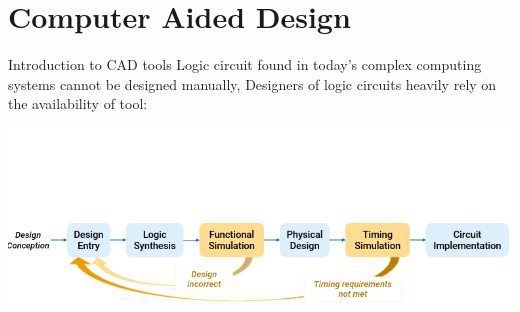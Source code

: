     \section{Computer Aided Design}
    \begin{parag}{Introduction to CAD tools}
        Logic circuit found in today's complex computing systems cannot be designed manually, Designers of logic circuits heavily rely on the availability of  tool:
   \begin{center}
       \includegraphics[scale=0.6]{12025-03-20.png}
   \end{center}
    
    \end{parag}
